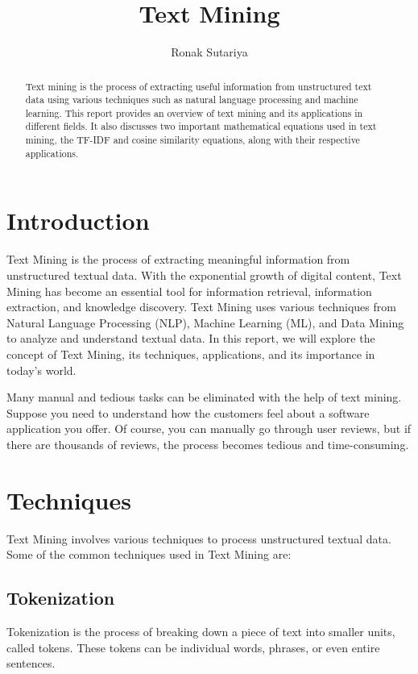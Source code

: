 \documentclass{article}
\title{Text Mining}
\author{Ronak Sutariya}
\begin{document}
\maketitle

\begin{abstract}
Text mining is the process of extracting useful information from unstructured text data using various techniques such as natural language processing and machine learning. This report provides an overview of text mining and its applications in different fields. It also discusses two important mathematical equations used in text mining, the TF-IDF and cosine similarity equations, along with their respective applications.
\end{abstract}

\section{Introduction}
Text Mining is the process of extracting meaningful information from unstructured textual data. With the exponential growth of digital content, Text Mining has become an essential tool for information retrieval, information extraction, and knowledge discovery. Text Mining uses various techniques from Natural Language Processing (NLP), Machine Learning (ML), and Data Mining to analyze and understand textual data. In this report, we will explore the concept of Text Mining, its techniques, applications, and its importance in today's world.

Many manual and tedious tasks can be eliminated with the help of text mining. Suppose you need to understand how the customers feel about a software application you offer. Of course, you can manually go through user reviews, but if there are thousands of reviews, the process becomes tedious and time-consuming.

\section{Techniques}

Text Mining involves various techniques to process unstructured textual data. Some of the common techniques used in Text Mining are:

\subsection{Tokenization}

Tokenization is the process of breaking down a piece of text into smaller units, called tokens. These tokens can be individual words, phrases, or even entire sentences.
\end{document}
